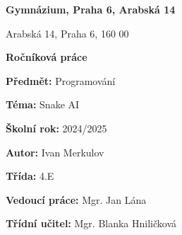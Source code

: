 \begin{titlepage}

\vspace{1.5cm}

\begin{center}
    {\LARGE \textbf{ Gymnázium, Praha 6, Arabská 14}}

    \vspace{1.0cm}

    {\Large Arabská 14, Praha 6, 160 00}

    \vspace{3.5cm}
 
    {\Huge \textbf{Ročníková práce}}
\end{center}

\vspace{6.0cm}

\textbf{Předmět:} {\large Programování}

\textbf{Téma:} {\large Snake AI}

\vspace{1.5cm}

\textbf{Školní rok:}  {\large2024/2025 }


\textbf{Autor:} {\large Ivan Merkulov}


\textbf{Třída:} {\large 4.E}


\textbf{Vedoucí práce:} {\large Mgr. Jan Lána}


\textbf{Třídní učitel:} {\large Mgr. Blanka Hniličková}

\end{titlepage}